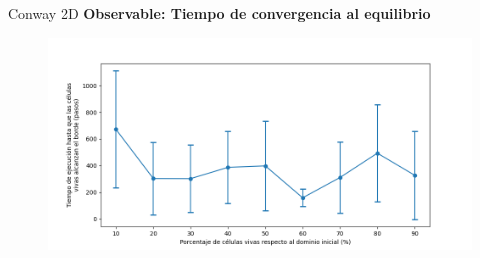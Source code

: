 \begin{frame}{Conway 2D}
    \textbf{Observable: Tiempo de convergencia al equilibrio}
    \begin{figure}[H]
        \centering
        \includegraphics[width=0.8\linewidth]{pic/conway2d/time_vs_input}
        \label{fig:conway2d:time:density}
    \end{figure}
\end{frame}




